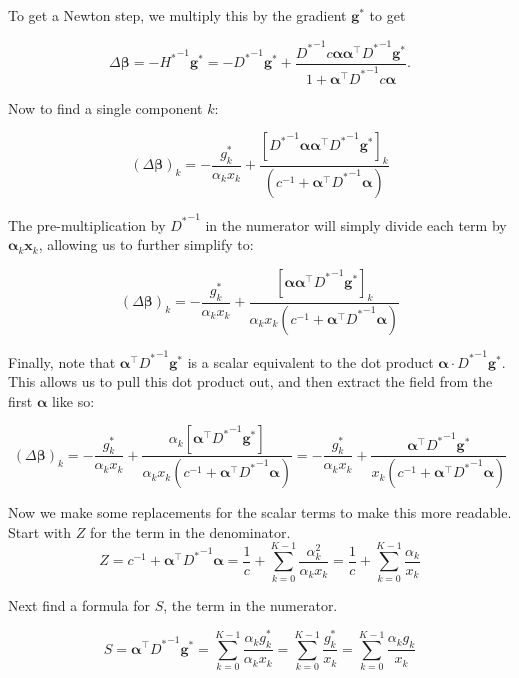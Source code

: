 \documentclass[twoside]{article}
\begin{document}
To get a Newton step, we multiply this by the gradient \(\boldsymbol{g}^*\) to get

\[
\Delta \boldsymbol{\beta} = -{H^*}^{-1} \boldsymbol{g}^*= - {D^*}^{-1} \boldsymbol{g}^* + \frac{{D^*}^{-1}c \boldsymbol{\alpha} \boldsymbol{\alpha}^{\top}{D^*}^{-1}\boldsymbol{g}^*}{1 + \boldsymbol{\alpha}^{\top}{D^*}^{-1}c \boldsymbol{\alpha}}.
\]

Now to find a single component $k$:

\[
\left({\Delta \boldsymbol{\beta}}\right)_k = - \frac{{g}^*_k}{{\alpha}_k{x}_k} + \frac{\left[{D^*}^{-1}\boldsymbol{\alpha}\boldsymbol{\alpha}^\top{D^*}^{-1}\boldsymbol{g}^*\right]_k}{(c^{-1} + \boldsymbol{\alpha}^\top{D^*}^{-1}\boldsymbol{\alpha})}
\]

The pre-multiplication by ${D^*}^{-1}$ in the numerator will simply divide each term by $\boldsymbol{\alpha}_k\boldsymbol{x}_k$, allowing us to further simplify to:

\[
\left({\Delta \boldsymbol{\beta}}\right)_k = - \frac{{g}^*_k}{{\alpha}_k{x}_k} + \frac{\left[\boldsymbol{\alpha}\boldsymbol{\alpha}^\top{D^*}^{-1}\boldsymbol{g}^*\right]_k}{{\alpha}_k{x}_k(c^{-1} + \boldsymbol{\alpha}^\top{D^*}^{-1}\boldsymbol{\alpha})}
\]

Finally, note that $\boldsymbol{\alpha}^\top{D^*}^{-1}\boldsymbol{g}^*$ is a scalar equivalent to the dot product $\boldsymbol{\alpha} \cdot {D^*}^{-1}\boldsymbol{g}^*$. This allows us to pull this dot product out, and then extract the field from the first $\boldsymbol{\alpha}$ like so:

\[
\left({\Delta \boldsymbol{\beta}}\right)_k = - \frac{{g}^*_k}{{\alpha}_k{x}_k} + \frac{{\alpha}_k\left[\boldsymbol{\alpha}^\top{D^*}^{-1}\boldsymbol{g}^*\right]}{{\alpha}_k{x}_k(c^{-1} + \boldsymbol{\alpha}^\top{D^*}^{-1}\boldsymbol{\alpha})} = - \frac{{g}^*_k}{{\alpha}_k{x}_k} + \frac{\boldsymbol{\alpha}^\top{D^*}^{-1}\boldsymbol{g}^*}{{x}_k(c^{-1} + \boldsymbol{\alpha}^\top{D^*}^{-1}\boldsymbol{\alpha})}
\]

Now we make some replacements for the scalar terms to make this more readable. Start with $Z$ for the term in the denominator.
\[
Z = c^{-1} + \boldsymbol{\alpha}^\top{D^*}^{-1}\boldsymbol{\alpha} = \frac{1}{c} + \sum_{k=0}^{K-1}\frac{{\alpha}_k^2}{{\alpha}_k{x}_k} = \frac{1}{c} + \sum_{k=0}^{K-1}\frac{{\alpha}_k}{{x}_k}
\]

Next find a formula for $S$, the term in the numerator.

\[
S = \boldsymbol{\alpha}^\top{D^*}^{-1}\boldsymbol{g}^* = \sum_{k=0}^{K-1} \frac{{\alpha}_k{g}^*_k}{{\alpha}_k{x}_k} = \sum_{k=0}^{K-1} \frac{{g}^*_k}{{x}_k} = \sum_{k=0}^{K-1} \frac{{\alpha}_k {g}_k}{{x}_k}
\]
\end{document}
